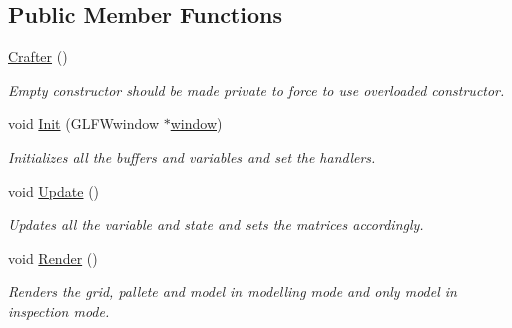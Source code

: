 \subsection*{Public Member Functions}
\begin{DoxyCompactItemize}
\item 
\hyperlink{classcft_1_1Crafter_a57796fe2de2fe073c8a7ef14e2a57d21}{Crafter} ()\hypertarget{classcft_1_1Crafter_a57796fe2de2fe073c8a7ef14e2a57d21}{}\label{classcft_1_1Crafter_a57796fe2de2fe073c8a7ef14e2a57d21}

\begin{DoxyCompactList}\small\item\em Empty constructor should be made private to force to use overloaded constructor. \end{DoxyCompactList}\item 
void \hyperlink{classcft_1_1Crafter_a0e56cb6de077230dfbc29dac9adace2a}{Init} (G\+L\+F\+Wwindow $\ast$\hyperlink{classcft_1_1Crafter_a70b8292b32d9eda7b3ce9e8c86161042}{window})\hypertarget{classcft_1_1Crafter_a0e56cb6de077230dfbc29dac9adace2a}{}\label{classcft_1_1Crafter_a0e56cb6de077230dfbc29dac9adace2a}

\begin{DoxyCompactList}\small\item\em Initializes all the buffers and variables and set the handlers. \end{DoxyCompactList}\item 
void \hyperlink{classcft_1_1Crafter_ad08567005970bdd4b33c2d3816ba4e5d}{Update} ()\hypertarget{classcft_1_1Crafter_ad08567005970bdd4b33c2d3816ba4e5d}{}\label{classcft_1_1Crafter_ad08567005970bdd4b33c2d3816ba4e5d}

\begin{DoxyCompactList}\small\item\em Updates all the variable and state and sets the matrices accordingly. \end{DoxyCompactList}\item 
void \hyperlink{classcft_1_1Crafter_a018462b2e4daf890ac697acbbc1f14d3}{Render} ()\hypertarget{classcft_1_1Crafter_a018462b2e4daf890ac697acbbc1f14d3}{}\label{classcft_1_1Crafter_a018462b2e4daf890ac697acbbc1f14d3}

\begin{DoxyCompactList}\small\item\em Renders the grid, pallete and model in modelling mode and only model in inspection mode. \end{DoxyCompactList}\end{DoxyCompactItemize}
